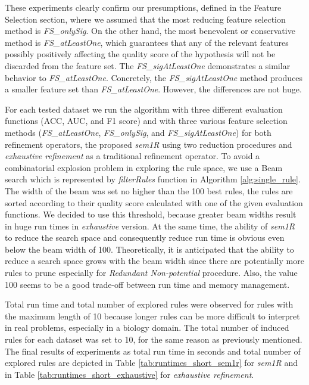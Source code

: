 \documentclass{bmcart}
\begin{document}

These experiments clearly confirm our presumptions, defined in the Feature Selection section, where we assumed that the most reducing feature selection method is \emph{FS\_onlySig}. On the other hand, the most benevolent or conservative method is \emph{FS\_atLeastOne}, which guarantees that any of the relevant features possibly positively affecting the quality score of the hypothesis will not be discarded from the feature set. The \emph{FS\_sigAtLeastOne} demonstrates a similar behavior to \emph{FS\_atLeastOne}. Concretely, the \emph{FS\_sigAtLeastOne} method produces a smaller feature set than \emph{FS\_atLeastOne}. However, the differences are not huge.

For each tested dataset we run the algorithm with three different evaluation functions (ACC, AUC, and F1 score) and with three various feature selection methods (\emph{FS\_atLeastOne}, \emph{FS\_onlySig}, and \emph{FS\_sigAtLeastOne}) for both refinement operators, the proposed \emph{sem1R} using two reduction procedures and \emph{exhaustive refinement} as a traditional refinement operator. To avoid a combinatorial explosion problem in exploring the rule space, we use a Beam search which is represented by \emph{filterRules} function in Algorithm \ref{alg:single_rule}. The width of the beam was set no higher than the 100 best rules, the rules are sorted according to their quality score calculated with one of the given evaluation functions. We decided to use this threshold, because greater beam widths result in huge run times in \emph{exhaustive} version. At the same time, the ability of \emph{sem1R} to reduce the search space and consequently reduce run time is obvious even below the beam width of 100. Theoretically, it is anticipated that the ability to reduce a search space grows with the beam width since there are potentially more rules to prune especially for \emph{Redundant Non-potential} procedure. Also, the value 100 seems to be a good trade-off between run time and memory management.

Total run time and total number of explored rules were observed for rules with the maximum length of 10 because longer rules can be more difficult to interpret in real problems, especially in a biology domain. The total number of induced rules for each dataset was set to 10, for the same reason as previously mentioned. The final results of experiments as total run time in seconds and total number of explored rules are depicted in Table \ref{tab:runtimes_short_sem1r} for \emph{sem1R} and in Table \ref{tab:runtimes_short_exhaustive} for \emph{exhaustive refinement}.
\end{document}

